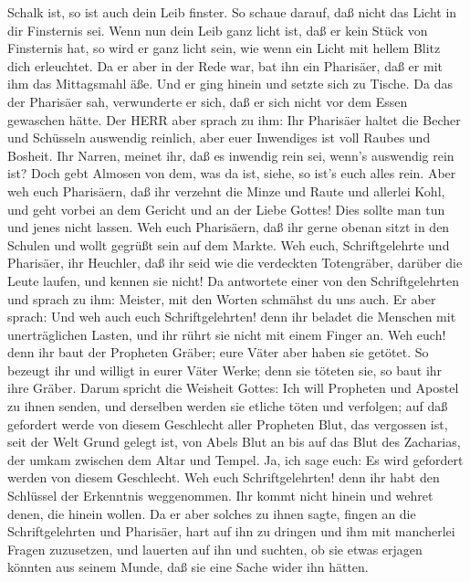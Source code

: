 Schalk ist, so ist auch dein Leib finster.  So schaue
darauf, daß nicht das Licht in dir Finsternis sei.  Wenn
nun dein Leib ganz licht ist, daß er kein Stück von Finsternis hat, so
wird er ganz licht sein, wie wenn ein Licht mit hellem Blitz dich
erleuchtet.  Da er aber in der Rede war, bat ihn ein
Pharisäer, daß er mit ihm das Mittagsmahl äße. Und er ging hinein und
setzte sich zu Tische.  Da das der Pharisäer sah,
verwunderte er sich, daß er sich nicht vor dem Essen gewaschen hätte.
 Der HERR aber sprach zu ihm: Ihr Pharisäer haltet die
Becher und Schüsseln auswendig reinlich, aber euer Inwendiges ist voll
Raubes und Bosheit.  Ihr Narren, meinet ihr, daß es
inwendig rein sei, wenn's auswendig rein ist?  Doch gebt
Almosen von dem, was da ist, siehe, so ist's euch alles rein.
 Aber weh euch Pharisäern, daß ihr verzehnt die Minze und
Raute und allerlei Kohl, und geht vorbei an dem Gericht und an der Liebe
Gottes! Dies sollte man tun und jenes nicht lassen.  Weh
euch Pharisäern, daß ihr gerne obenan sitzt in den Schulen und wollt
gegrüßt sein auf dem Markte.  Weh euch, Schriftgelehrte und
Pharisäer, ihr Heuchler, daß ihr seid wie die verdeckten Totengräber,
darüber die Leute laufen, und kennen sie nicht!  Da
antwortete einer von den Schriftgelehrten und sprach zu ihm: Meister,
mit den Worten schmähst du uns auch.  Er aber sprach: Und
weh auch euch Schriftgelehrten! denn ihr beladet die Menschen mit
unerträglichen Lasten, und ihr rührt sie nicht mit einem Finger an.
 Weh euch! denn ihr baut der Propheten Gräber; eure Väter
aber haben sie getötet.  So bezeugt ihr und willigt in
eurer Väter Werke; denn sie töteten sie, so baut ihr ihre Gräber.
 Darum spricht die Weisheit Gottes: Ich will Propheten und
Apostel zu ihnen senden, und derselben werden sie etliche töten und
verfolgen;  auf daß gefordert werde von diesem Geschlecht
aller Propheten Blut, das vergossen ist, seit der Welt Grund gelegt ist,
 von Abels Blut an bis auf das Blut des Zacharias, der
umkam zwischen dem Altar und Tempel. Ja, ich sage euch: Es wird
gefordert werden von diesem Geschlecht.  Weh euch
Schriftgelehrten! denn ihr habt den Schlüssel der Erkenntnis
weggenommen. Ihr kommt nicht hinein und wehret denen, die hinein wollen.
 Da er aber solches zu ihnen sagte, fingen an die
Schriftgelehrten und Pharisäer, hart auf ihn zu dringen und ihm mit
mancherlei Fragen zuzusetzen,  und lauerten auf ihn und
suchten, ob sie etwas erjagen könnten aus seinem Munde, daß sie eine
Sache wider ihn hätten.

